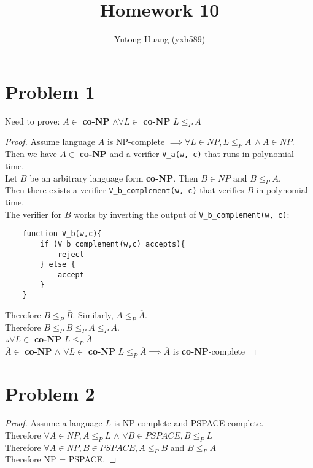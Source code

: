 \documentclass[letterpaper]{article}
\title{\vspace{-2cm}Homework 10}
\author{Yutong Huang (yxh589)}
\date{}
\begin{document}
\maketitle
\section*{Problem 1}
Need to prove: $\overline{A} \in$ \textbf{co-NP} $\land \forall L \in$ \textbf{co-NP} $L \leq_P \overline{A}$
\begin{proof}
    Assume language $A$ is NP-complete $\implies \forall L \in NP, L \leq_P A\  \land A \in NP$.\\
    Then we have $\overline{A} \in $ \textbf{co-NP} and a verifier \verb#V_a(w, c)# that runs in polynomial time.\\
    Let $B$ be an arbitrary language form \textbf{co-NP}. Then $ \overline{B} \in NP $ and $\overline{B} \leq_P A$.\\
    Then there exists a verifier \verb#V_b_complement(w, c)# that verifies $\overline{B}$ in polynomial time.\\

    The verifier for $B$ works by inverting the output of \verb#V_b_complement(w, c)#:
    \begin{verbatim}
    function V_b(w,c){
        if (V_b_complement(w,c) accepts){
            reject
        } else {
            accept
        }
    }
    \end{verbatim}
    Therefore $B \leq_P \overline{B}$. Similarly, $A \leq_P \overline{A}$.\\
    Therefore $B \leq_P \overline{B} \leq_P A \leq_P \overline{A}$.\\
    $\therefore \forall L \in$  \textbf{co-NP} $L \leq_P \overline{A}$\\

    $ \overline{A} \in $ \textbf{co-NP} $\land$ $\forall L \in$  \textbf{co-NP} $L \leq_P \overline{A} \implies \overline{A}$ is \textbf{co-NP}-complete
\end{proof}

\section*{Problem 2}
\begin{proof}
    Assume a language $L$ is NP-complete and PSPACE-complete.\\
    Therefore $\forall A \in NP, A \leq_P L$ $\land$ $\forall B \in PSPACE, B \leq_P L$\\
    Therefore $\forall A \in NP, B \in PSPACE, A \leq_P B$ and $B \leq_P A$\\
    Therefore NP = PSPACE.
\end{proof}
\end{document}
